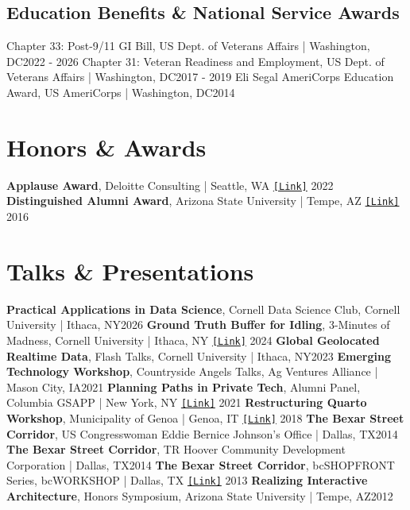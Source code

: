 \documentclass{article}
\begin{document}
    \subsection*{Education Benefits \& National Service Awards}
        Chapter 33: Post-9/11 GI Bill, US Dept. of Veterans Affairs | Washington, DC\hfill{2022 - 2026}\newline  %
        Chapter 31: Veteran Readiness and Employment, US Dept. of Veterans Affairs | Washington, DC\hfill{2017 - 2019}\newline  %
        Eli Segal AmeriCorps Education Award, US AmeriCorps | Washington, DC\hfill{2014}  %
    \section*{Honors \& Awards}
        \textbf{Applause Award}, Deloitte Consulting | Seattle, WA \href{https://www.deloitte.com/global/en/about/recognition.html}{\texttt{[Link]}} \hfill{2022}\newline %
        \textbf{Distinguished Alumni Award}, Arizona State University | Tempe, AZ \href{https://students.barretthonors.asu.edu/alumni/distinguished-alumni-awards}{\texttt{[Link]}} \hfill{2016} 
    \section*{Talks \& Presentations}
        \textbf{Practical Applications in Data Science}, Cornell Data Science Club, Cornell University | Ithaca, NY\hfill{2026}\newline
        \textbf{Ground Truth Buffer for Idling}, 3-Minutes of Madness, Cornell University | Ithaca, NY \href{https://vod.video.cornell.edu/media/3+Minutes+of+Madness/1_k154xz22/145463691}{\texttt{[Link]}} \hfill{2024}\newline
        \textbf{Global Geolocated Realtime Data}, Flash Talks, Cornell University | Ithaca, NY\hfill{2023}\newline
        \textbf{Emerging Technology Workshop}, Countryside Angels Talks, Ag Ventures Alliance | Mason City, IA\hfill{2021}\newline
        \textbf{Planning Paths in Private Tech}, Alumni Panel, Columbia GSAPP | New York, NY \href{https://cdn.filepicker.io/api/file/GVI4hgAQrSz6QGOp66Ox?&fit=max}{\texttt{[Link]}} \hfill{2021} \newline
        \textbf{Restructuring Quarto Workshop}, Municipality of Genoa | Genoa, IT \href{https://www.youtube.com/watch?v=NaVhil1sQfY}{\texttt{[Link]}} \hfill{2018}\newline
        \textbf{The Bexar Street Corridor}, US Congresswoman Eddie Bernice Johnson's Office | Dallas, TX\hfill{2014}\newline
        \textbf{The Bexar Street Corridor}, TR Hoover Community Development Corporation | Dallas, TX\hfill{2014}\newline
        \textbf{The Bexar Street Corridor}, bcSHOPFRONT Series, bcWORKSHOP | Dallas, TX \href{https://vimeo.com/81649797?fl=pl&fe=vl}{\texttt{[Link]}} \hfill{2013} \newline
        \textbf{Realizing Interactive Architecture}, Honors Symposium, Arizona State University | Tempe, AZ\hfill{2012}
\end{document}
